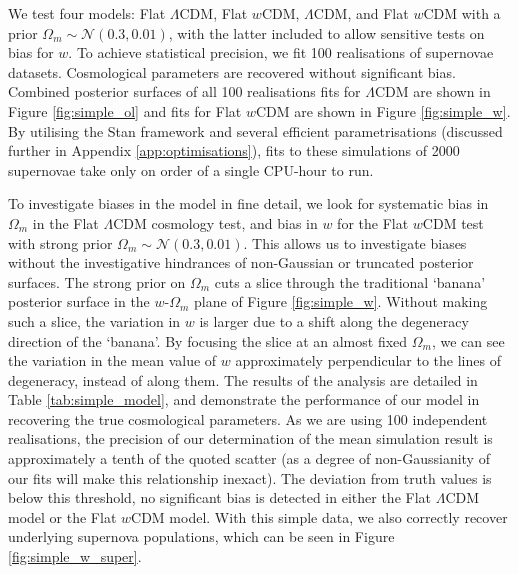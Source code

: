 \documentclass[a4paper,fleqn,usenatbib,manuscript]{emulateapj}
\newcommand{\blue}{\color{blue}}
\begin{document}
We test four models: Flat $\Lambda$CDM, Flat $w$CDM, $\Lambda$CDM, and Flat $w$CDM with a prior $\Omega_m \sim \mathcal{N}(0.3, 0.01)$, with the latter included to allow sensitive tests on bias for $w$. To achieve statistical precision, we fit 100 realisations of supernovae datasets. Cosmological parameters are recovered without significant bias. Combined posterior surfaces of all 100 realisations fits for $\Lambda$CDM are shown in Figure \ref{fig:simple_ol} and fits for Flat $w$CDM are shown in Figure \ref{fig:simple_w}. By utilising the Stan framework and several efficient parametrisations (discussed further in Appendix \ref{app:optimisations}), fits to these simulations of 2000 supernovae take only on order of a single CPU-hour to run.

To investigate biases in the model in fine detail, we look for systematic bias in $\Omega_m$ in the Flat $\Lambda$CDM cosmology test, and bias in $w$ for the Flat $w$CDM test with strong prior $\Omega_m \sim \mathcal{N}(0.3, 0.01)$. This allows us to investigate biases without the investigative hindrances of non-Gaussian or truncated posterior surfaces. The strong prior on $\Omega_m$ cuts a slice through the traditional `banana' posterior surface in the $w$-$\Omega_m$ plane of Figure \ref{fig:simple_w}. Without making such a slice, the variation in $w$ is larger due to a shift along the degeneracy direction of the `banana'. By focusing the slice at an almost fixed $\Omega_m$, we can see the variation in the mean value of $w$ approximately perpendicular to the lines of degeneracy, instead of along them. The results of the analysis are detailed in Table \ref{tab:simple_model}, and demonstrate the performance of our model in recovering the true cosmological parameters.  As we are using 100 independent realisations, the precision of our determination of the mean simulation result is {\blue approximately a tenth of the quoted scatter (as a degree of non-Gaussianity of our fits will make this relationship inexact)}. The deviation from truth values is below this threshold, no significant bias is detected in either the Flat $\Lambda$CDM model or the Flat $w$CDM model. With this simple data, we also correctly recover underlying supernova populations, which can be seen in Figure \ref{fig:simple_w_super}.
\end{document}
